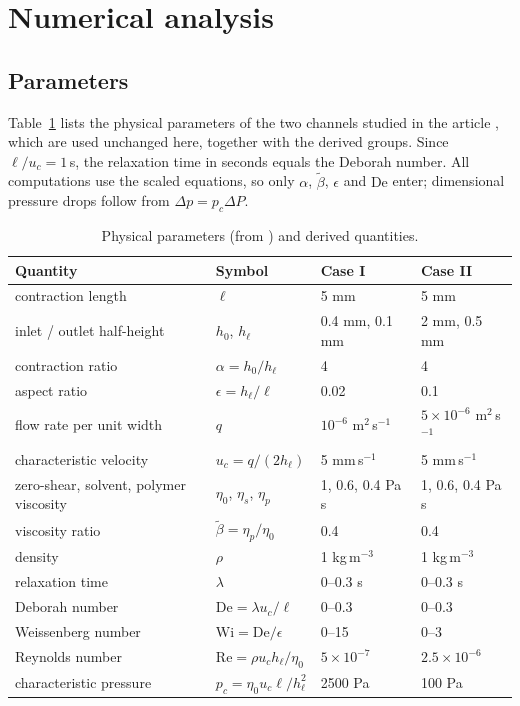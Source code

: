 \documentclass[11pt,a4paper]{article}
\newcommand{\De}{\mathrm{De}}
\newcommand{\bt}{\tilde\beta}
\begin{document}
\section{Numerical analysis}

\subsection{Parameters}
Table~\ref{tab:params} lists the physical parameters of the two channels studied in the article \cite{boyko2022}, which are used unchanged here, together with the derived groups. Since $\ell/u_c=1$\,s, the relaxation time in seconds equals the Deborah number. All computations use the scaled equations, so only $\alpha$, $\bt$, $\epsilon$ and $\De$ enter; dimensional pressure drops follow from $\Delta p=p_c\Delta P$.

\begin{table}[H]
\centering\small
\caption{Physical parameters (from \cite{boyko2022}) and derived quantities.}
\label{tab:params}
\begin{tabular}{@{}llll@{}}
\toprule
Quantity & Symbol & Case I & Case II\\
\midrule
contraction length & $\ell$ & 5 mm & 5 mm\\
inlet / outlet half-height & $h_0$, $h_\ell$ & 0.4 mm, 0.1 mm & 2 mm, 0.5 mm\\
contraction ratio & $\alpha=h_0/h_\ell$ & 4 & 4\\
aspect ratio & $\epsilon=h_\ell/\ell$ & 0.02 & 0.1\\
flow rate per unit width & $q$ & $10^{-6}$ m$^2$\,s$^{-1}$ & $5\times10^{-6}$ m$^2$\,s$^{-1}$\\
characteristic velocity & $u_c=q/(2h_\ell)$ & 5 mm\,s$^{-1}$ & 5 mm\,s$^{-1}$\\
zero-shear, solvent, polymer viscosity & $\eta_0$, $\eta_s$, $\eta_p$ & 1, 0.6, 0.4 Pa\,s & 1, 0.6, 0.4 Pa\,s\\
viscosity ratio & $\bt=\eta_p/\eta_0$ & 0.4 & 0.4\\
density & $\rho$ & 1 kg\,m$^{-3}$ & 1 kg\,m$^{-3}$\\
relaxation time & $\lambda$ & 0--0.3 s & 0--0.3 s\\
Deborah number & $\De=\lambda u_c/\ell$ & 0--0.3 & 0--0.3\\
Weissenberg number & $\mathrm{Wi}=\De/\epsilon$ & 0--15 & 0--3\\
Reynolds number & $\mathrm{Re}=\rho u_ch_\ell/\eta_0$ & $5\times10^{-7}$ & $2.5\times10^{-6}$\\
characteristic pressure & $p_c=\eta_0u_c\ell/h_\ell^2$ & 2500 Pa & 100 Pa\\
\bottomrule
\end{tabular}
\end{table}
\end{document}
